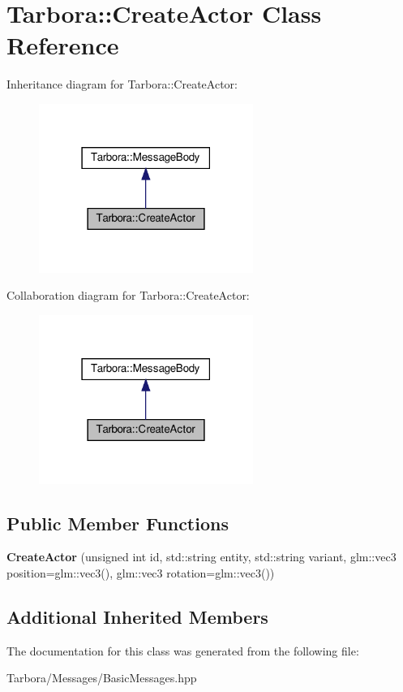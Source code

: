 \hypertarget{classTarbora_1_1CreateActor}{}\section{Tarbora\+:\+:Create\+Actor Class Reference}
\label{classTarbora_1_1CreateActor}


Inheritance diagram for Tarbora\+:\+:Create\+Actor\+:
\nopagebreak
\begin{figure}[H]
\begin{center}
\leavevmode
\includegraphics[width=198pt]{classTarbora_1_1CreateActor__inherit__graph}
\end{center}
\end{figure}


Collaboration diagram for Tarbora\+:\+:Create\+Actor\+:
\nopagebreak
\begin{figure}[H]
\begin{center}
\leavevmode
\includegraphics[width=198pt]{classTarbora_1_1CreateActor__coll__graph}
\end{center}
\end{figure}
\subsection*{Public Member Functions}
\begin{DoxyCompactItemize}
\item 
\mbox{\label{classTarbora_1_1CreateActor_a8bd921da8eeba3df7cce996eb1baf271}} 
{\bfseries Create\+Actor} (unsigned int id, std\+::string entity, std\+::string variant, glm\+::vec3 position=glm\+::vec3(), glm\+::vec3 rotation=glm\+::vec3())
\end{DoxyCompactItemize}
\subsection*{Additional Inherited Members}


The documentation for this class was generated from the following file\+:\begin{DoxyCompactItemize}
\item 
Tarbora/\+Messages/Basic\+Messages.\+hpp\end{DoxyCompactItemize}
